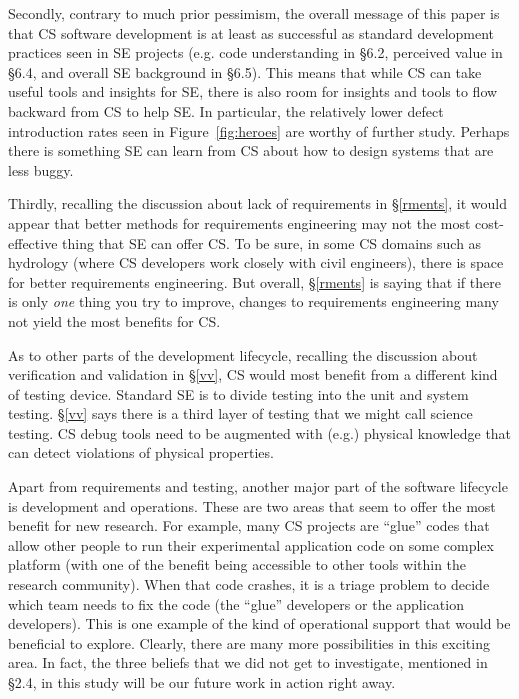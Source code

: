 \documentclass[sigconf]{acmart}
\begin{document}
Secondly, contrary to much prior pessimism, the overall message of this paper is that CS software development is at least as successful as standard development practices seen in SE projects (e.g. code understanding in \S6.2, perceived value in \S6.4, and overall SE background in \S6.5). This means that while CS can take useful tools and insights for SE, there is also room for insights and tools to flow backward from CS to help SE.
In particular, the relatively lower defect introduction rates seen in Figure~\ref{fig:heroes} are worthy of further study. Perhaps there is something SE can learn from CS about how to design systems that are less buggy.

Thirdly, recalling the discussion about lack of requirements in \S\ref{rments}, it would appear that better methods for requirements engineering may not the most cost-effective thing that SE can offer CS. To be sure, in some CS domains such as hydrology (where CS developers work closely with civil engineers), there is space for better requirements engineering. But overall, \S\ref{rments} is saying that if there is only {\em one} thing you try to improve, changes to requirements engineering many not yield the most benefits for CS.

As to other parts of the development lifecycle,  recalling the discussion about verification and validation in \S\ref{vv}, CS would most benefit from a different kind of testing device. Standard SE is to divide testing into the unit and system testing. \S\ref{vv} says there is a third layer of testing that we might call science testing. CS debug tools need to be augmented with (e.g.)  physical knowledge that can detect violations of physical properties.

Apart from requirements and testing, another major part of the software lifecycle is development and operations. These are two areas that seem to offer the most benefit for new research. For example, many CS projects are ``glue'' codes that allow other people to run their experimental application code on some complex platform (with one of the benefit being accessible to other tools within the research community). When that code crashes, it is a triage problem to decide which team needs to fix the code (the ``glue'' developers or the application developers). This is one example of the kind of operational support that would be beneficial to explore. Clearly, there are many more possibilities in this exciting area. In fact, the three beliefs that we did not get to investigate, mentioned in \S2.4, in this study will be our future work in action right away. 
\end{document}
